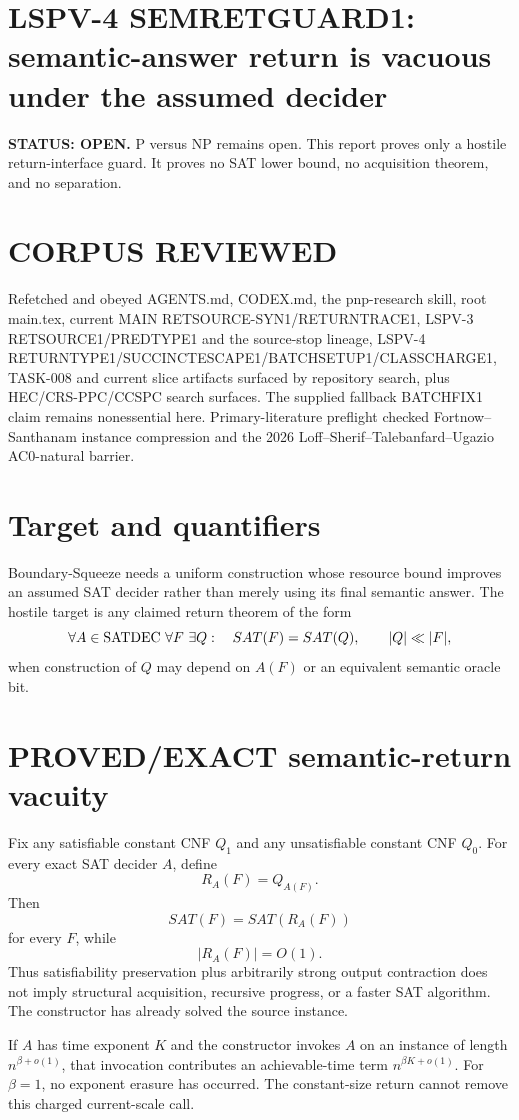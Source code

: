 \documentclass[11pt]{article}
\begin{document}
\section*{LSPV-4 SEMRETGUARD1: semantic-answer return is vacuous under the assumed decider}
\textbf{STATUS: OPEN.} P versus NP remains open. This report proves only a hostile return-interface guard. It proves no SAT lower bound, no acquisition theorem, and no separation.

\section*{CORPUS REVIEWED}
Refetched and obeyed AGENTS.md, CODEX.md, the pnp-research skill, root main.tex, current MAIN RETSOURCE-SYN1/RETURNTRACE1, LSPV-3 RETSOURCE1/PREDTYPE1 and the source-stop lineage, LSPV-4 RETURNTYPE1/SUCCINCTESCAPE1/BATCHSETUP1/CLASSCHARGE1, TASK-008 and current slice artifacts surfaced by repository search, plus HEC/CRS-PPC/CCSPC search surfaces. The supplied fallback BATCHFIX1 claim remains nonessential here. Primary-literature preflight checked Fortnow--Santhanam instance compression and the 2026 Loff--Sherif--Talebanfard--Ugazio AC0-natural barrier.

\section*{Target and quantifiers}
Boundary-Squeeze needs a uniform construction whose resource bound improves an assumed SAT decider rather than merely using its final semantic answer. The hostile target is any claimed return theorem of the form
\[
\forall A\in {\rm SATDEC}\ \forall F\ \exists Q:
\quad SAT(F)=SAT(Q),\qquad |Q|\ll |F|,
\]
when construction of $Q$ may depend on $A(F)$ or an equivalent semantic oracle bit.

\section*{PROVED/EXACT semantic-return vacuity}
Fix any satisfiable constant CNF $Q_1$ and any unsatisfiable constant CNF $Q_0$. For every exact SAT decider $A$, define
\[
R_A(F)=Q_{A(F)}.
\]
Then
\[
SAT(F)=SAT(R_A(F))
\]
for every $F$, while
\[
|R_A(F)|=O(1).
\]
Thus satisfiability preservation plus arbitrarily strong output contraction does not imply structural acquisition, recursive progress, or a faster SAT algorithm. The constructor has already solved the source instance.

If $A$ has time exponent $K$ and the constructor invokes $A$ on an instance of length $n^{\beta+o(1)}$, that invocation contributes an achievable-time term $n^{\beta K+o(1)}$. For $\beta=1$, no exponent erasure has occurred. The constant-size return cannot remove this charged current-scale call.
\end{document}
